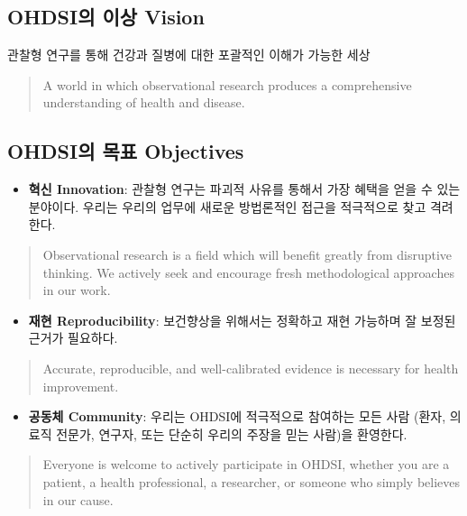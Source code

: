 \documentclass[11pt]{book}
\providecommand{\tightlist}{%
  \setlength{\itemsep}{0pt}\setlength{\parskip}{0pt}}
\theoremstyle{definition}
\theoremstyle{definition}
\theoremstyle{definition}
\theoremstyle{remark}
\begin{document}
\subsection{OHDSI의 이상 Vision}\label{ohdsi--vision}

관찰형 연구를 통해 건강과 질병에 대한 포괄적인 이해가 가능한 세상

\begin{quote}
A world in which observational research produces a comprehensive
understanding of health and disease. 
\end{quote}

\subsection{OHDSI의 목표 Objectives}\label{ohdsi--objectives}

\begin{itemize}
\tightlist
\item
  \textbf{혁신 Innovation}: 관찰형 연구는 파괴적 사유를 통해서 가장
  혜택을 얻을 수 있는 분야이다. 우리는 우리의 업무에 새로운 방법론적인
  접근을 적극적으로 찾고 격려한다.
\end{itemize}

\begin{quote}
Observational research is a field which will benefit greatly from
disruptive thinking. We actively seek and encourage fresh methodological
approaches in our work.
\end{quote}

\begin{itemize}
\tightlist
\item
  \textbf{재현 Reproducibility}: 보건향상을 위해서는 정확하고 재현
  가능하며 잘 보정된 근거가 필요하다.
\end{itemize}

\begin{quote}
Accurate, reproducible, and well-calibrated evidence is necessary for
health improvement.
\end{quote}

\begin{itemize}
\tightlist
\item
  \textbf{공동체 Community}: 우리는 OHDSI에 적극적으로 참여하는 모든
  사람 (환자, 의료직 전문가, 연구자, 또는 단순히 우리의 주장을 믿는
  사람)을 환영한다.
\end{itemize}

\begin{quote}
Everyone is welcome to actively participate in OHDSI, whether you are a
patient, a health professional, a researcher, or someone who simply
believes in our cause.
\end{quote}
\end{document}
